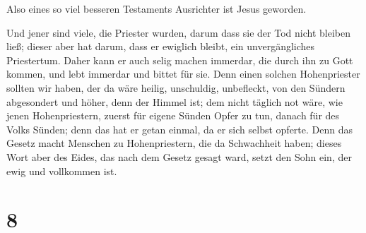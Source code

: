 Also eines so viel besseren Testaments Ausrichter ist
Jesus geworden.

 Und jener sind viele, die Priester wurden, darum dass
sie der Tod nicht bleiben ließ;  dieser aber hat darum,
dass er ewiglich bleibt, ein unvergängliches Priestertum.
 Daher kann er auch selig machen immerdar, die durch ihn
zu Gott kommen, und lebt immerdar und bittet für sie. 
Denn einen solchen Hohenpriester sollten wir haben, der da wäre heilig,
unschuldig, unbefleckt, von den Sündern abgesondert und höher, denn der
Himmel ist;  dem nicht täglich not wäre, wie jenen
Hohenpriestern, zuerst für eigene Sünden Opfer zu tun, danach für des
Volks Sünden; denn das hat er getan einmal, da er sich selbst opferte.
 Denn das Gesetz macht Menschen zu Hohenpriestern, die da
Schwachheit haben; dieses Wort aber des Eides, das nach dem Gesetz
gesagt ward, setzt den Sohn ein, der ewig und vollkommen ist.

\hypertarget{section-7}{%
\section{8}\label{section-7}}

